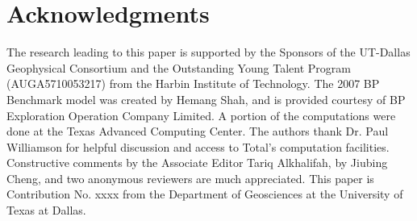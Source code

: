 \documentclass[manuscript,ulem,graphix,revised]{geophysics}
\begin{document}
\section{Acknowledgments}
\indent\indent
The research leading to this paper is supported by the Sponsors of the
UT-Dallas Geophysical Consortium and the Outstanding Young Talent Program (AUGA5710053217) from the Harbin Institute of Technology. The 2007 BP Benchmark model was created by Hemang Shah, and is provided courtesy of BP Exploration Operation Company Limited. A portion of the computations were done at the Texas Advanced Computing Center. The authors thank Dr. Paul Williamson for helpful discussion and access to Total's computation facilities. Constructive comments by the Associate Editor Tariq Alkhalifah, by Jiubing Cheng, and two anonymous reviewers are much appreciated. This paper is Contribution No. xxxx from the Department of Geosciences at the University of Texas at Dallas. 


\newpage


\end{document}
